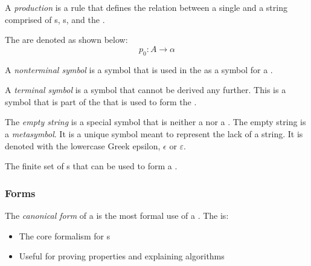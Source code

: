 \begin{definition}[Production]\label{def:Production}
  A \emph{production} is a rule that defines the relation between a single  and a string comprised of s, s, and the .

  The are denoted as shown below:
  \begin{equation}\label{eq:Production}
    p_{0}: A \rightarrow \alpha
  \end{equation}
\end{definition}

\begin{definition}\label{def:Nonterminal_Symbol}
  A \emph{nonterminal symbol} is a symbol that is used in the  as a symbol for a .
\end{definition}

\begin{definition}\label{def:Terminal_Symbol}
  A \emph{terminal symbol} is a symbol that cannot be derived any further.
  This is a symbol that is part of the  that is used to form the .
\end{definition}

\begin{definition}\label{def:Empty_String}
  The \emph{empty string} is a special symbol that is neither a  nor a .
  The empty string is a \emph{metasymbol}.
  It is a unique symbol meant to represent the lack of a string.
  It is denoted with the lowercase Greek epsilon, $\epsilon$ or $\varepsilon$.
\end{definition}

\begin{definition}[Alphabet]\label{def:Alphabet}
  The finite set of s that can be used to form a .
\end{definition}

\subsubsection{ Forms}\label{subsubsec:CFG_Forms}
\begin{definition}\label{def:CFG_Canonical_Form}
  The \emph{canonical form} of a  is the most formal use of a .
  The  is:
  \begin{itemize}[noitemsep]
  \item The core formalism for s
  \item Useful for proving properties and explaining algorithms
  \end{itemize}
\end{definition}

